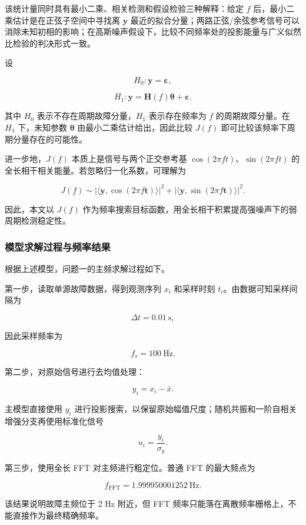 该统计量同时具有最小二乘、相关检测和假设检验三种解释：给定 \(f\) 后，最小二乘估计是在正弦子空间中寻找离 \(\mathbf y\) 最近的拟合分量；两路正弦/余弦参考信号可以消除未知初相的影响；在高斯噪声假设下，比较不同频率处的投影能量与广义似然比检验的判决形式一致。


设


\[
H_0:\mathbf{y}=\boldsymbol{\varepsilon},
\]


\[
H_1:\mathbf{y}=\mathbf{H}(f)\boldsymbol{\theta}+\boldsymbol{\varepsilon}.
\]


其中 \(H_0\) 表示不存在周期故障分量，\(H_1\) 表示存在频率为 \(f\) 的周期故障分量。在 \(H_1\) 下，未知参数 \(\boldsymbol{\theta}\) 由最小二乘估计给出，因此比较 \(J(f)\) 即可比较该频率下周期分量存在的可能性。


进一步地，\(J(f)\) 本质上是信号与两个正交参考基 \(\cos(2\pi ft)\)、\(\sin(2\pi ft)\) 的全长相干相关能量。若忽略归一化系数，可理解为


\[
J(f)\sim
\left|\langle \mathbf{y},\cos(2\pi f\mathbf{t})\rangle\right|^2
+
\left|\langle \mathbf{y},\sin(2\pi f\mathbf{t})\rangle\right|^2.
\]


因此，本文以 \(J(f)\) 作为频率搜索目标函数，用全长相干积累提高强噪声下的弱周期检测稳定性。




\subsubsection{模型求解过程与频率结果}


根据上述模型，问题一的主频求解过程如下。


第一步，读取单源故障数据，得到观测序列 \(x_i\) 和采样时刻 \(t_i\)。由数据可知采样间隔为


\[
\Delta t=0.01\ \mathrm{s},
\]


因此采样频率为


\[
f_s=100\ \mathrm{Hz}.
\]


第二步，对原始信号进行去均值处理：


\[
y_i=x_i-\bar{x}.
\]


主模型直接使用 \(y_i\) 进行投影搜索，以保留原始幅值尺度；随机共振和一阶自相关增强分支再使用标准化信号


\[
u_i=\frac{y_i}{\sigma_y}.
\]


第三步，使用全长 FFT 对主频进行粗定位。普通 FFT 的最大频点为


\[
f_{\mathrm{FFT}}=1.999950001252\ \mathrm{Hz}.
\]


该结果说明故障主频位于 2 Hz 附近，但 FFT 频率只能落在离散频率栅格上，不能直接作为最终精确频率。


